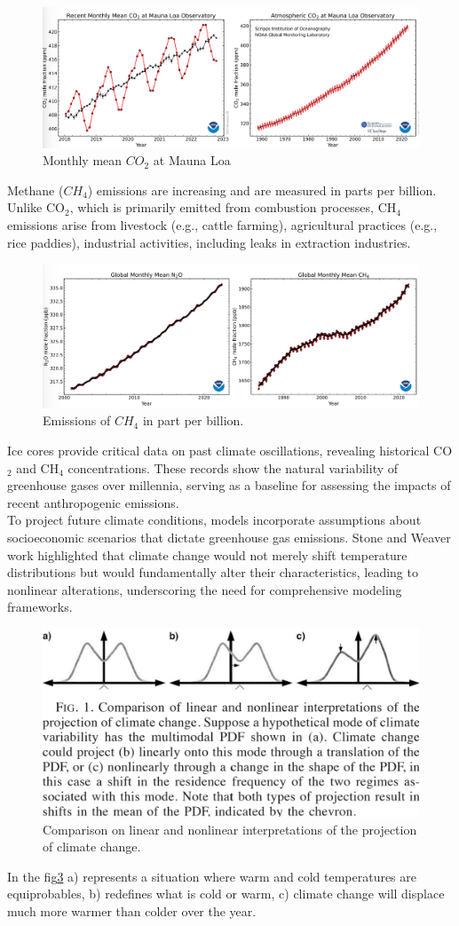 \begin{figure}[htpb]
	\centering
	\includegraphics[width=0.5\linewidth]{uploads/co2image.png}
	\caption{Monthly mean $CO_2$ at Mauna Loa}
	\label{fig:enter-label}
\end{figure}
Methane ($CH_4$) emissions are increasing and are measured in parts per billion. Unlike CO$_2$, which is primarily emitted from combustion processes, CH$_4$ emissions arise from livestock (e.g., cattle farming), agricultural practices (e.g., rice paddies), industrial activities, including leaks in extraction industries.
\begin{figure}[htpb]
	\centering
	\includegraphics[width=0.5\linewidth]{uploads/ch4.png}
	\caption{Emissions of $CH_4$ in part per billion.}
	\label{fig:enter-label}
\end{figure}
Ice cores provide critical data on past climate oscillations, revealing historical CO$_2$ and CH$_4$ concentrations. These records show the natural variability of greenhouse gases over millennia, serving as a baseline for assessing the impacts of recent anthropogenic emissions.\\




To project future climate conditions, models incorporate assumptions about socioeconomic scenarios that dictate greenhouse gas emissions. Stone and Weaver\cite{St200} work highlighted that climate change would not merely shift temperature distributions but would fundamentally alter their characteristics, leading to nonlinear alterations, underscoring the need for comprehensive modeling frameworks.

\begin{figure}[htpb]
	\centering
	\includegraphics[width=0.5\linewidth]{uploads/nonlinclimatechange.png}
	\caption{Comparison on linear and nonlinear interpretations of the projection of climate change.}
	\label{fig:clim model}
\end{figure}
In the fig\ref{fig:clim model} a) represents a situation where warm and cold temperatures are equiprobables, b) redefines what is cold or warm, c) climate change will displace much more warmer than colder over the year.

